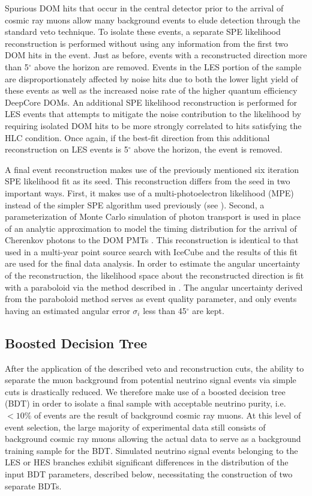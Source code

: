 \documentclass[manuscript]{aastex}
\begin{document}
Spurious DOM hits that occur in the central detector prior to the arrival of cosmic ray muons allow many background events to elude detection through the standard veto technique. To isolate these events, a separate SPE likelihood reconstruction is performed without using any information from the first two DOM hits in the event. Just as before, events with a reconstructed direction more than 5$^{\circ}$ above the horizon are removed. Events in the LES portion of the sample are disproportionately affected by noise hits due to both the lower light yield of these events as well as the increased noise rate of the higher quantum efficiency DeepCore DOMs. An additional SPE likelihood reconstruction is performed for LES events that attempts to mitigate the noise contribution to the likelihood by requiring isolated DOM hits to be more strongly correlated to hits satisfying the HLC condition. Once again, if the best-fit direction from this additional reconstruction on LES events is 5$^{\circ}$ above the horizon, the event is removed.

A final event reconstruction makes use of the previously mentioned six iteration SPE likelihood fit as its seed. This reconstruction differs from the seed in two important ways. First, it makes use of a multi-photoelectron likelihood (MPE) instead of the simpler SPE algorithm used previously (see \cite{2004NIMPA.524..169A}). Second, a parameterization of Monte Carlo simulation of photon transport is used in place of an analytic approximation to model the timing distribution for the arrival of Cherenkov photons to the DOM PMTs \citep{2013CoPhC.184.2214W}. This reconstruction is identical to that used in a multi-year point source search with IceCube \citep{2014ApJ...796..109A} and the results of this fit are used for the final data analysis. In order to estimate the angular uncertainty of the reconstruction, the likelihood space about the reconstructed direction is fit with a paraboloid via the method described in \cite{2006APh....25..220N}. The angular uncertainty derived from the paraboloid method serves as event quality parameter, and only events having an estimated angular error $\sigma_i$ less than 45$^{\circ}$ are kept.
 
\subsection{Boosted Decision Tree}
After the application of the described veto and reconstruction cuts, the ability to separate the muon background from potential neutrino signal events via simple cuts is drastically reduced. We therefore make use of a boosted decision tree (BDT) in order to isolate a final sample with acceptable neutrino purity, i.e. $<10 \%$ of events are the result of background cosmic ray muons. At this level of event selection, the large majority of experimental data still consists of background cosmic ray muons allowing the actual data to serve as a background training sample for the BDT. Simulated neutrino signal events belonging to the LES or HES branches exhibit significant differences in the distribution of the input BDT parameters, described below, necessitating the construction of two separate BDTs. 
\end{document}
